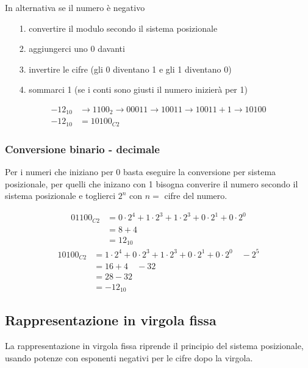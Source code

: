 \documentclass{article}
\begin{document}
In alternativa se il numero è negativo
\begin{itemize}[topsep=3pt, itemsep=0pt]
	\item[1.] convertire il modulo secondo il sistema posizionale
	\item[2.] aggiungerci uno 0 davanti
	\item[3.] invertire le cifre (gli 0 diventano 1 e gli 1 diventano 0)
	\item[4.] sommarci 1 (se i conti sono giusti il numero inizierà per 1)
\end{itemize}
\begin{align*}
	-12_{10} &\rightarrow 1100_{2} \rightarrow 00011 \rightarrow 10011 \rightarrow 10011 + 1 \rightarrow 10100 \\
	-12_{10} &= 10100_{C2}
\end{align*}

\subsubsection*{Conversione binario - decimale}
Per i numeri che iniziano per 0 basta eseguire la conversione per sistema posizionale, per quelli che inizano con
1 bisogna converire il numero secondo il sistema posizionale e toglierci \(2^n\) con \(n =\) cifre del numero.

\begin{align*}
	01100_{C2} &= 0 \cdot 2 ^ 4 + 1 \cdot 2 ^ 3 + 1 \cdot 2 ^ 3 + 0 \cdot 2 ^ 1 + 0 \cdot 2 ^ 0 \\
	&= 8 + 4 \\
	&= 12_{10}
\end{align*}
\begin{align*}
	10100_{C2} &= 1 \cdot 2 ^ 4 +  0 \cdot 2 ^ 3 + 1 \cdot 2 ^ 3 + 0 \cdot 2 ^ 1 + 0 \cdot 2 ^ 0 \quad - 2 ^ 5\\
	&= 16 + 4 \quad - 32 \\
	&= 28 - 32 \\
	&= -12_{10}
\end{align*}

\newpage

\subsection{Rappresentazione in virgola fissa}
La rappresentazione in virgola fissa riprende il principio del sistema posizionale, usando potenze con esponenti negativi
per le cifre dopo la virgola.
\end{document}
